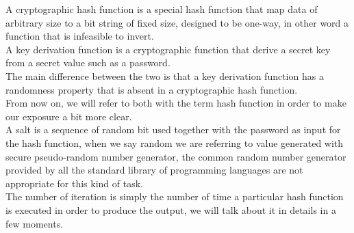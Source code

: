 A cryptographic hash function is a special hash function that map data of arbitrary size to a bit string of fixed size, designed to be one-way, in other word a function that is infeasible to invert.\\
A key derivation function is a cryptographic function that derive a secret key from a secret value such as a password.\\
The main difference between the two is that a key derivation function has a randomness property that is absent in a cryptographic hash function.\\
From now on, we will refer to both with the term hash function in order to make our exposure a bit more clear.\\
A salt is a sequence of random bit used together with the password as input for the hash function, when we say random we are referring to value generated with secure pseudo-random number generator, the common random number generator provided by all the standard library of programming languages are not appropriate for this kind of task.\\
The number of iteration is simply the number of time a particular hash function is executed in order to produce the output, we will talk about it in details in a few moments.\\

